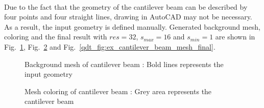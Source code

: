 \paragraph{}
Due to the fact that the geometry of the cantilever beam can be described by four points and four straight lines, drawing in AutoCAD may not be necessary.
As a result, the input geometry is defined manually.
Generated background mesh, coloring and the final result with $res=32$, $s_{max}=16$ and $s_{min}=1$ are shown in Fig.~\ref{qdt_fig:ex_cantilever_beam_background_mesh}, Fig.~\ref{qdt_fig:ex_cantilever_beam_mesh_coloring} and Fig.~\ref{qdt_fig:ex_cantilever_beam_mesh_final}.
%
    \begin{figure}
        \centering
        \caption[Background mesh of cantilever beam]{Background mesh of cantilever beam : Bold lines represents the input geometry}
        \label{qdt_fig:ex_cantilever_beam_background_mesh}
    \end{figure}
%
    \begin{figure}
        \centering
        \caption[Mesh coloring of cantilever beam]{Mesh coloring of cantilever beam : Grey area represents the cantilever beam}
        \label{qdt_fig:ex_cantilever_beam_mesh_coloring}
    \end{figure}
